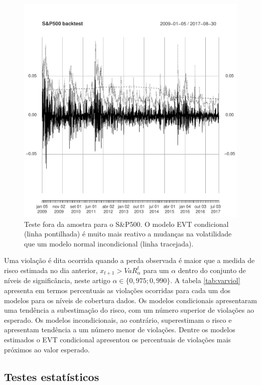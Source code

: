 \documentclass[1p]{elsarticle}
\theoremstyle{definition}
\begin{document}
\begin{figure}[H]
	\centering
	\includegraphics[width=1\linewidth]{figs/artigo-sp500backtest}
	\caption{Teste fora da amostra para o S\&P500. O modelo EVT condicional (linha pontilhada) é muito mais reativo a mudanças na volatilidade que um modelo normal incondicional (linha tracejada).}
	\label{fig:artigo-sp500backtest}
\end{figure}

Uma violação é dita ocorrida quando a perda observada é maior que a medida de risco estimada no dia anterior, $x_{t+1}>VaR^t_\alpha$ para um $\alpha$ dentro do conjunto de níveis de significância, neste artigo $\alpha \in \{0,975; 0,990\}$. A tabela \ref{tab:varviol} apresenta em termos percentuais as violações ocorridas para cada um dos modelos para os níveis de cobertura dados. Os modelos condicionais apresentaram uma tendência a subestimação do risco, com um número superior de violações ao esperado. Os modelos incondicionais, ao contrário, superestimam o risco e apresentam tendência a um número menor de violações. Dentre os modelos estimados o EVT condicional apresentou os percentuais de violações mais próximos ao valor esperado.



\subsection{Testes estatísticos}
\label{sec:testes}
\end{document}
